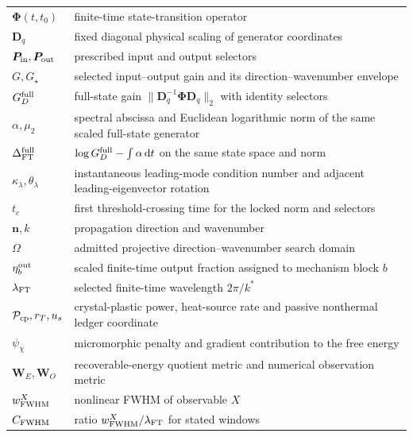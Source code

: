 \begin{longtable}{@{}p{}p{}@{}}
$\boldsymbol\Phi(t,t_0)$ & finite-time state-transition operator \\
$\boldsymbol D_q$ & fixed diagonal physical scaling of generator coordinates \\
$\boldsymbol P_{\rm in},\boldsymbol P_{\rm out}$ & prescribed input and output selectors \\
$G,G_\star$ & selected input--output gain and its direction--wavenumber envelope \\
$G_D^{\rm full}$ & full-state gain $\|\boldsymbol D_q^{-1}\boldsymbol\Phi\boldsymbol D_q\|_2$ with identity selectors \\
$\alpha,\mu_2$ & spectral abscissa and Euclidean logarithmic norm of the same scaled full-state generator \\
$\Delta_{\rm FT}^{\rm full}$ & $\log G_D^{\rm full}-\int\alpha\,\mathrm dt$ on the same state space and norm \\
$\kappa_\lambda,\theta_\lambda$ & instantaneous leading-mode condition number and adjacent leading-eigenvector rotation \\
$t_c$ & first threshold-crossing time for the locked norm and selectors \\
$\boldsymbol n,k$ & propagation direction and wavenumber \\
$\Omega$ & admitted projective direction--wavenumber search domain \\
$\eta_b^{\rm out}$ & scaled finite-time output fraction assigned to mechanism block $b$ \\
$\lambda_{\rm FT}$ & selected finite-time wavelength $2\pi/k^*$ \\
$\mathcal P_{\rm cp},r_T,u_s$ & crystal-plastic power, heat-source rate and passive nonthermal ledger coordinate \\
$\psi_\chi$ & micromorphic penalty and gradient contribution to the free energy \\
$\boldsymbol W_E,\boldsymbol W_O$ & recoverable-energy quotient metric and numerical observation metric \\
$w_{\rm FWHM}^{X}$ & nonlinear FWHM of observable $X$ \\
$C_{\rm FWHM}$ & ratio $w_{\rm FWHM}^{X}/\lambda_{\rm FT}$ for stated windows \\
\bottomrule
\end{longtable}
